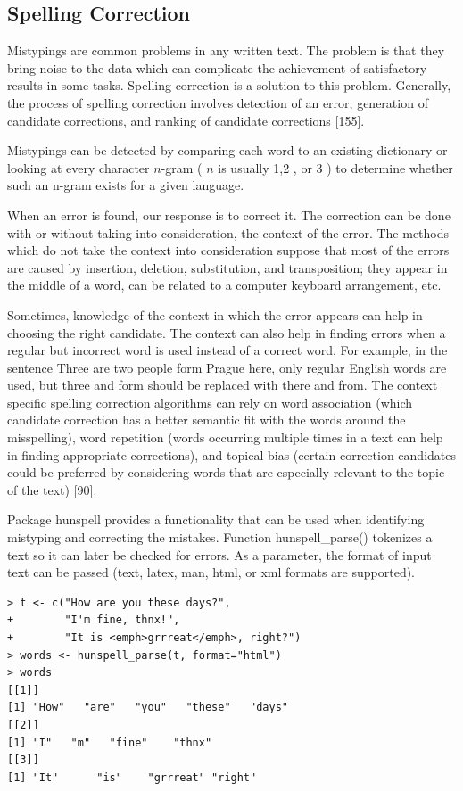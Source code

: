 \documentclass[11pt,openany,executivepaper]{book}
\begin{document}
\subsection{Spelling Correction}
Mistypings are common problems in any written text. The problem is that they bring noise to the data which can complicate the achievement of satisfactory results in some tasks. Spelling correction is a solution to this problem. Generally, the process of spelling correction involves detection of an error, generation of candidate corrections, and ranking of candidate corrections [155].

Mistypings can be detected by comparing each word to an existing dictionary or looking at every character $n$-gram ( $n$ is usually 1,2 , or 3 ) to determine whether such an n-gram exists for a given language.

When an error is found, our response is to correct it. The correction can be done with or without taking into consideration, the context of the error. The methods which do not take the context into consideration suppose that most of the errors are caused by insertion, deletion, substitution, and transposition; they appear in the middle of a word, can be related to a computer keyboard arrangement, etc.

Sometimes, knowledge of the context in which the error appears can help in choosing the right candidate. The context can also help in finding errors when a regular but incorrect word is used instead of a correct word. For example, in the sentence Three are two people form Prague here, only regular English words are used, but three and form should be replaced with there and from. The context specific spelling correction algorithms can rely on word association (which candidate correction has a better semantic fit with the words around the misspelling), word repetition (words occurring multiple times in a text can help in finding appropriate corrections), and topical bias (certain correction candidates could be preferred by considering words that are especially relevant to the topic of the text) [90].

Package hunspell provides a functionality that can be used when identifying mistyping and correcting the mistakes. Function hunspell\_parse() tokenizes a text so it can later be checked for errors. As a parameter, the format of input text can be passed (text, latex, man, html, or xml formats are supported).

\begin{verbatim}
> t <- c("How are you these days?",
+        "I'm fine, thnx!",
+        "It is <emph>grrreat</emph>, right?")
> words <- hunspell_parse(t, format="html")
> words
[[1]]
[1] "How"   "are"   "you"   "these"   "days"
[[2]]
[1] "I"   "m"   "fine"    "thnx"
[[3]]
[1] "It"      "is"    "grrreat" "right"
\end{verbatim}
\end{document}
